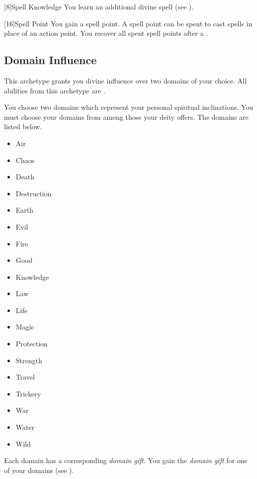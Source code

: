         [8]{Spell Knowledge}
        You learn an additional divine spell (see ).

        [16]{Spell Point} 
        You gain a spell point.
        A spell point can be spent to cast spells in place of an action point.
        You recover all spent spell points after a .

    \subsection{Domain Influence}
        This archetype grants you divine influence over two domains of your choice.
        All abilities from this archetype are .

        You choose two domains which represent your personal spiritual inclinations.
        You must choose your domains from among those your deity offers.
        The domains are listed below.

        \begin{itemize}
            \item{Air}
            \item{Chaos}
            \item{Death}
            \item{Destruction}
            \item{Earth}
            \item{Evil}
            \item{Fire}
            \item{Good}
            \item{Knowledge}
            \item{Law}
            \item{Life}
            \item{Magic}
            \item{Protection}
            \item{Strength}
            \item{Travel}
            \item{Trickery}
            \item{War}
            \item{Water}
            \item{Wild}
        \end{itemize}

        Each domain has a corresponding \textit{domain gift}.
        You gain the \textit{domain gift} for one of your domains (see ).

